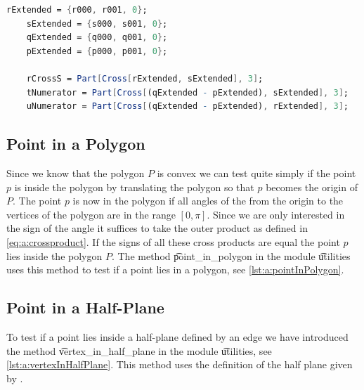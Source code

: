	\begin{lstlisting}[float, language=Mathematica, label={lst:a:lineSegmentIntersectionMat}, caption={Mathematica code used to compute the value of \t{r_cross_s}, \t{u_numerator} and \t{t_numerator}.}]
	rExtended = {r000, r001, 0};
	sExtended = {s000, s001, 0};
	qExtended = {q000, q001, 0};
	pExtended = {p000, p001, 0};

	rCrossS = Part[Cross[rExtended, sExtended], 3];
	tNumerator = Part[Cross[(qExtended - pExtended), sExtended], 3];
	uNumerator = Part[Cross[(qExtended - pExtended), rExtended], 3];\end{lstlisting}

	

\subsection*{Point in a Polygon}
	Since we know that the polygon $P$ is convex we can test quite simply if the point $p$ is inside the polygon by translating the polygon so that $p$ becomes the origin of $P$. The point $p$ is now in the polygon if all angles of the from the origin to the vertices of the polygon are in the range $[0, \pi]$. Since we are only interested in the sign of the angle it suffices to take the outer product as defined in \autoref{eq:a:crossproduct}. If the signs of all these cross products are equal the point $p$ lies inside the polygon $P$. \cite{wolfram} The method \t{point_in_polygon} in the module \t{utilities} uses this method to test if a point lies in a polygon, see \autoref{lst:a:pointInPolygon}.

		

\subsection*{Point in a Half-Plane}
	To test if a point lies inside a half-plane defined by an edge we have introduced the method \t{vertex_in_half_plane} in the module \t{utilities}, see \autoref{lst:a:vertexInHalfPlane}. This method uses the definition of the half plane given by \citeauthor{o1982new}.

	

